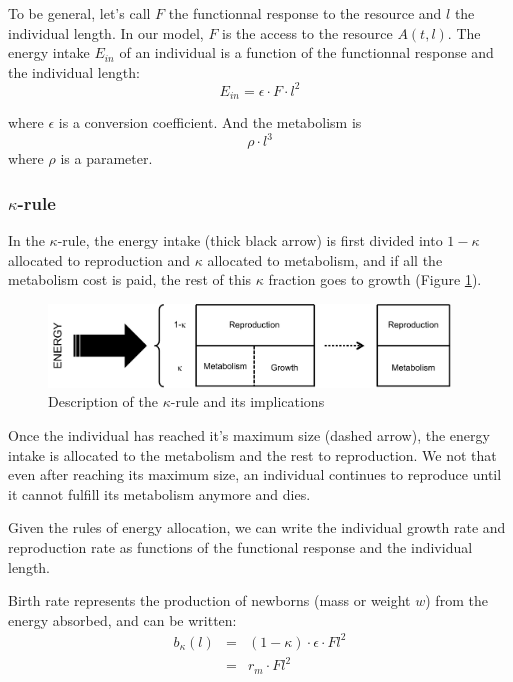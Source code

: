 To be general, let's call $F$ the functionnal response to the resource and $l$
the individual length. In our model, $F$ is the access to the resource
$A(t,l)$.
The energy intake $E_{in}$ of an individual is a function of the functionnal
response and the individual length:
\[ E_{in}=\epsilon\cdot F\cdot l^{2} \]

where $\epsilon$ is a conversion coefficient. And the metabolism
is 
\[
\rho\cdot l^{3}
\]
 where $\rho$ is a parameter. 

\subsubsection*{$\kappa$-rule}\label{subsubsec:SupMat21}


In the $\kappa$-rule, the energy intake (thick black arrow) is first
divided into $1-\kappa$ allocated to reproduction and $\kappa$ allocated
to metabolism, and if all the metabolism cost is paid, the rest of
this $\kappa$ fraction goes to growth (Figure \ref{Fig4-SM5}). 

\begin{figure}[ht] %
\centering
\includegraphics[width=0.95\textwidth]{4_ChapThe1/Fig/KRule}
\caption[Details of the
$\kappa$-rule]{Description of the $\kappa$-rule and its implications}
\label{Fig4-SM5}
\end{figure}

Once the individual has reached
it's maximum size (dashed arrow), the energy intake is allocated to
the metabolism and the rest to reproduction. We not that even after
reaching its maximum size, an individual continues to reproduce until
it cannot fulfill its metabolism anymore and dies.

Given the rules of energy allocation, we can write the individual
growth rate and reproduction rate as functions of the functional response
and the individual length.

Birth rate represents the production of newborns (mass or weight $w$)
from the energy absorbed, and can be written:
\begin{eqnarray*}
b_{\kappa}(l) & = & (1-\kappa)\cdot\epsilon\cdot Fl^{2}\\
 & = & r_{m}\cdot Fl^{2}
\end{eqnarray*}


